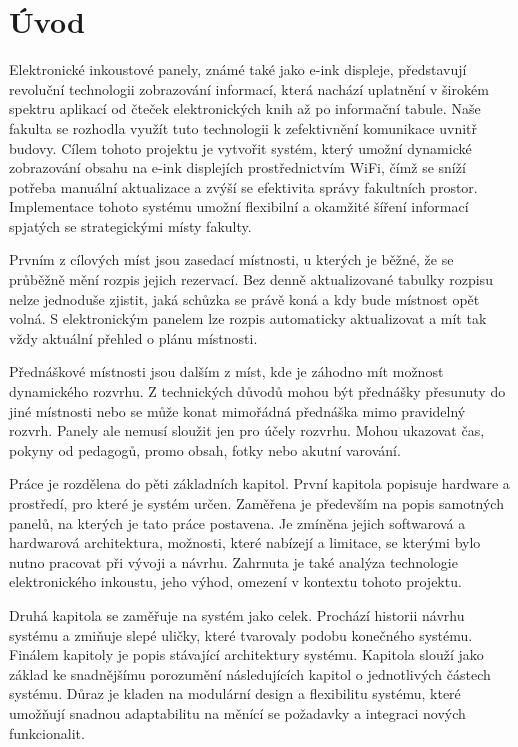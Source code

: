 \chapter{Úvod}

Elektronické inkoustové panely, známé také jako e-ink displeje, představují revoluční technologii zobrazování informací, která nachází uplatnění v širokém spektru aplikací od čteček elektronických knih až po informační tabule. Naše fakulta se rozhodla využít tuto technologii k zefektivnění komunikace uvnitř budovy. Cílem tohoto projektu je vytvořit systém, který umožní dynamické zobrazování obsahu na e-ink displejích prostřednictvím WiFi, čímž se sníží potřeba manuální aktualizace a zvýší se efektivita správy fakultních prostor. Implementace tohoto systému umožní flexibilní a okamžité šíření informací spjatých se strategickými místy fakulty.

Prvním z cílových míst jsou zasedací místnosti, u kterých je běžné, že se průběžně mění rozpis jejich rezervací. Bez denně aktualizované tabulky rozpisu nelze jednoduše zjistit, jaká schůzka se právě koná a kdy bude místnost opět volná. S elektronickým panelem lze rozpis automaticky aktualizovat a mít tak vždy aktuální přehled o plánu místnosti.

Přednáškové místnosti jsou dalším z míst, kde je záhodno mít možnost dynamického rozvrhu. Z technických důvodů mohou být přednášky přesunuty do jiné místnosti nebo se může konat mimořádná přednáška mimo pravidelný rozvrh. Panely ale nemusí sloužit jen pro účely rozvrhu. Mohou ukazovat čas, pokyny od pedagogů, promo obsah, fotky nebo akutní varování.

Práce je rozdělena do pěti základních kapitol. První kapitola popisuje hardware a prostředí, pro které je systém určen. Zaměřena je především na popis samotných panelů, na kterých je tato práce postavena. Je zmíněna jejich softwarová a hardwarová architektura, možnosti, které nabízejí a limitace, se kterými bylo nutno pracovat při vývoji a návrhu. Zahrnuta je také analýza technologie elektronického inkoustu, jeho výhod, omezení v kontextu tohoto projektu.

Druhá kapitola se zaměřuje na systém jako celek. Prochází historii návrhu systému a zmiňuje slepé uličky, které tvarovaly podobu konečného systému. Finálem kapitoly je popis stávající architektury systému. Kapitola slouží jako základ ke snadnějšímu porozumění následujících kapitol o jednotlivých částech systému. Důraz je kladen na modulární design a flexibilitu systému, které umožňují snadnou adaptabilitu na měnící se požadavky a integraci nových funkcionalit.

